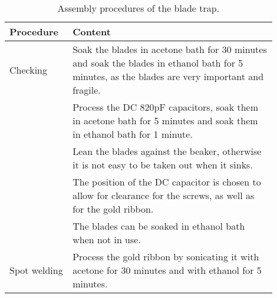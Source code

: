\begin{table}
    \centering
    \caption{Assembly procedures of the blade trap.}
    \begin{tabular}{p{0.2\linewidth}p{0.7\linewidth}}
        \toprule
        Procedure    & Content                                                                                                                                                                                                                                                                     \\

        \midrule
        Checking     & Soak the blades in acetone bath for 30 minutes and soak the blades in ethanol bath for 5 minutes, as the blades are very important and fragile.                                                                                                                             \\
                     & Process the DC 820pF capacitors, soak them in acetone bath for 5 minutes and soak them in ethanol bath for 1 minute.                                                                                                                                                        \\
                     & Lean the blades against the beaker, otherwise it is not easy to be taken out when it sinks.                                                                                                                                                                                 \\
                     & The position of the DC capacitor is chosen to allow for clearance for the screws, as well as for the gold ribbon.                                                                                                                                                           \\
                     & The blades can be soaked in ethanol bath when not in use.                                                                                                                                                                                                                   \\
        Spot welding & Process the gold ribbon by sonicating it with acetone for 30 minutes and with ethanol for 5 minutes.                                                                                                                                                                        \\

\end{tabular}
\end{table}

